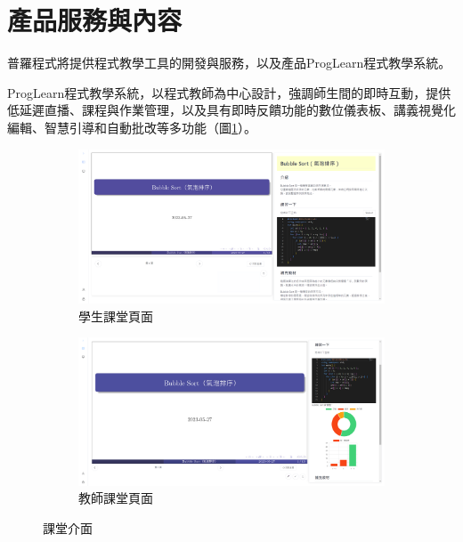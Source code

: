 \section{產品服務與內容}

普羅程式將提供程式教學工具的開發與服務，以及產品ProgLearn程式教學系統。

ProgLearn程式教學系統，以程式教師為中心設計，強調師生間的即時互動，提供低延遲直播、課程與作業管理，以及具有即時反饋功能的數位儀表板、講義視覺化編輯、智慧引導和自動批改等多功能（圖\ref{fig:Classroom}）。

\begin{figure}[H]
  \begin{subfigure}{0.5\linewidth}
    \centering
    \includegraphics[width=1\textwidth]{images/student.png}
    \caption{學生課堂頁面}
  \end{subfigure}
  \begin{subfigure}{0.5\linewidth}
    \centering
    \includegraphics[width=1\textwidth]{images/teacher.png}
    \caption{教師課堂頁面}
  \end{subfigure}
  \caption{課堂介面}
  \label{fig:Classroom}
\end{figure}

